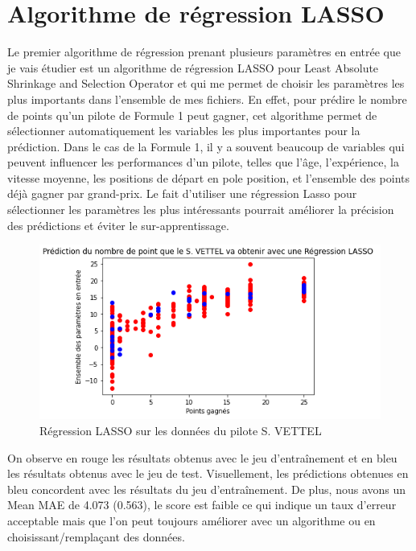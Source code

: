 \section{Algorithme de régression LASSO}

Le premier algorithme de régression prenant plusieurs paramètres en entrée que je vais étudier est un algorithme de régression LASSO pour Least Absolute Shrinkage and Selection Operator et qui me permet de choisir les paramètres les plus importants dans l'ensemble de mes fichiers. En effet, pour prédire le nombre de points qu'un pilote de Formule 1 peut gagner, cet algorithme permet de sélectionner automatiquement les variables les plus importantes pour la prédiction. Dans le cas de la Formule 1, il y a souvent beaucoup de variables qui peuvent influencer les performances d'un pilote, telles que l'âge, l'expérience, la vitesse moyenne, les positions de départ en pole position, et l'ensemble des points déjà gagner par grand-prix. Le fait d'utiliser une régression Lasso pour sélectionner les paramètres les plus intéressants pourrait améliorer la précision des prédictions et éviter le sur-apprentissage.

\begin{figure}[H]
    \centering
    \includegraphics[width=.8\textwidth]{images/LASSOVettel.png} 
    \caption{Régression LASSO sur les données du pilote S. VETTEL}
\end{figure}

On observe en rouge les résultats obtenus avec le jeu d'entraînement et en bleu les résultats obtenus avec le jeu de test. Visuellement, les prédictions obtenues en bleu concordent avec les résultats du jeu d'entraînement. De plus, nous avons un Mean MAE de 4.073 (0.563), le score est faible ce qui indique un taux d'erreur acceptable mais que l'on peut toujours améliorer avec un algorithme ou en choisissant/remplaçant des données.


